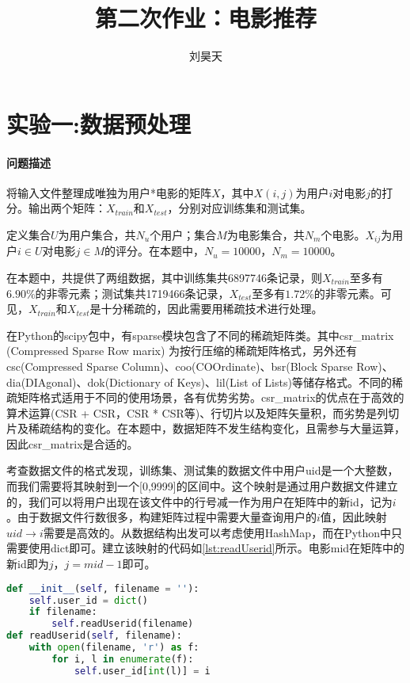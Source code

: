 \documentclass[a4paper,12pt]{article}
\title{第二次作业：电影推荐}
\author{刘昊天}
\begin{document}
    \maketitle
    \section{实验一:数据预处理}
    \paragraph{问题描述}
    将输入文件整理成唯独为用户*电影的矩阵$X$，其中$X(i,j)$为用户$i$对电影$j$的打分。输出两个矩阵：$X_{train}$和$X_{test}$，分别对应训练集和测试集。

    定义集合$U$为用户集合，共$N_u$个用户；集合$M$为电影集合，共$N_m$个电影。$X_{ij}$为用户$i\in U$对电影$j\in M$的评分。在本题中，$N_u=10000$，$N_m=10000$。

    在本题中，共提供了两组数据，其中训练集共6897746条记录，则$X_{train}$至多有$6.90\%$的非零元素；测试集共1719466条记录，$X_{test}$至多有$1.72\%$的非零元素。可见，$X_{train}$和$X_{test}$是十分稀疏的，因此需要用稀疏技术进行处理。

    在Python的scipy包中，有sparse模块包含了不同的稀疏矩阵类。其中csr\_matrix (Compressed Sparse Row marix) 为按行压缩的稀疏矩阵格式，另外还有csc(Compressed Sparse Column)、coo(COOrdinate)、bsr(Block Sparse Row)、dia(DIAgonal)、dok(Dictionary of Keys)、lil(List of Lists)等储存格式。不同的稀疏矩阵格式适用于不同的使用场景，各有优势劣势。csr\_matrix的优点在于高效的算术运算(CSR + CSR，CSR * CSR等)、行切片以及矩阵矢量积，而劣势是列切片及稀疏结构的变化。在本题中，数据矩阵不发生结构变化，且需参与大量运算，因此csr\_matrix是合适的。

    考查数据文件的格式发现，训练集、测试集的数据文件中用户uid是一个大整数，而我们需要将其映射到一个[0,9999]的区间中。这个映射是通过用户数据文件建立的，我们可以将用户出现在该文件中的行号减一作为用户在矩阵中的新id，记为$i$。由于数据文件行数很多，构建矩阵过程中需要大量查询用户的$i$值，因此映射$uid\rightarrow i$需要是高效的。从数据结构出发可以考虑使用HashMap，而在Python中只需要使用dict即可。建立该映射的代码如\cref{lst:readUserid}所示。电影mid在矩阵中的新id即为$j$，$j=mid-1$即可。
    \begin{lstlisting}[language=python,caption={readUserid},label=lst:readUserid]
def __init__(self, filename = ''):
    self.user_id = dict()
    if filename:
        self.readUserid(filename)
def readUserid(self, filename):
    with open(filename, 'r') as f:
        for i, l in enumerate(f):
            self.user_id[int(l)] = i
    \end{lstlisting}
\end{document}
